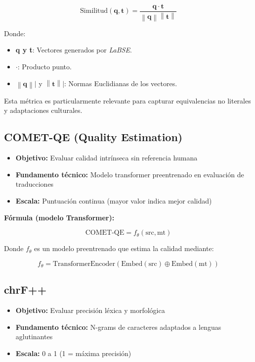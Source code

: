         \begin{equation}
            \text{Similitud}(\mathbf{q}, \mathbf{t}) = \frac{\mathbf{q} \cdot \mathbf{t}}{\left\lVert\mathbf{q}\right\rVert \left\lVert\mathbf{t}\right\rVert}
        \end{equation}
 
        Donde:
        \begin{itemize}
            \item \textbf{q y t}: Vectores generados por \textit{LaBSE}.
            \item $\cdot$: Producto punto.
            \item $\left\lVert\mathbf{q}\right\rVert|$ y $\left\lVert\mathbf{t}\right\rVert|$: Normas Euclidianas de los vectores.
        \end{itemize}
    
    Esta métrica es particularmente relevante para capturar equivalencias no literales y adaptaciones culturales. 

    \subsection{COMET-QE (Quality Estimation)}
        \begin{itemize}
            \item \textbf{Objetivo:} Evaluar calidad intrínseca sin referencia humana
            \item \textbf{Fundamento técnico:} Modelo transformer preentrenado en evaluación de traducciones
            \item \textbf{Escala:} Puntuación continua (mayor valor indica mejor calidad)
        \end{itemize}

        \textbf{Fórmula (modelo Transformer):}

        \begin{equation}
        \text{COMET-QE} = f_{\theta}(\text{src}, \text{mt})
        \end{equation}
        
        Donde \( f_{\theta} \) es un modelo preentrenado que estima la calidad mediante:
        
        \begin{equation}
        f_{\theta} = \text{TransformerEncoder}(\text{Embed}(\text{src}) \oplus \text{Embed}(\text{mt}))
        \label{eq:Comet QE}
        \end{equation}
        
        
    \subsection{chrF++}
        \begin{itemize}
            \item \textbf{Objetivo:} Evaluar precisión léxica y morfológica
            \item \textbf{Fundamento técnico:} N-grams de caracteres adaptados a lenguas aglutinantes
            \item \textbf{Escala:} 0 a 1 (1 = máxima precisión)
        \end{itemize}

